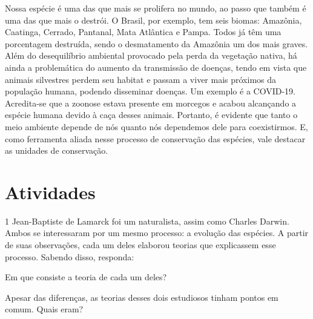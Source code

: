 {Nossa espécie é uma das que mais se prolifera no mundo, ao passo que
também é uma das que mais o destrói. O Brasil, por exemplo, tem seis biomas: Amazônia, Caatinga, Cerrado, Pantanal, Mata Atlântica e Pampa. Todos
já têm uma porcentagem destruída, sendo o desmatamento da Amazônia um
dos mais graves. Além do desequilíbrio ambiental provocado pela perda da
vegetação nativa, há ainda a problemática do aumento da transmissão de
doenças, tendo em vista que animais silvestres perdem seu habitat e
passam a viver mais próximos da população humana, podendo disseminar
doenças. Um exemplo é a COVID-19. Acredita-se que a zoonose estava
presente em morcegos e acabou alcançando a espécie humana devido à caça
desses animais. Portanto, é evidente que tanto o meio ambiente depende
de nós quanto nós dependemos dele para coexistirmos. E, como ferramenta
aliada nesse processo de conservação das espécies, vale destacar as
unidades de conservação.}

\section{Atividades}

\num{1} Jean-Baptiste de Lamarck foi um naturalista, assim como Charles
  Darwin. Ambos se interessaram por um mesmo processo: a evolução das
  espécies. A partir de suas observações, cada um deles elaborou teorias
  que explicassem esse processo. Sabendo disso, responda:

\begin{escolha}
\item Em que consiste a teoria de cada um deles?


\item Apesar das diferenças, as teorias desses dois estudiosos tinham pontos em comum. Quais eram?

\end{escolha}

